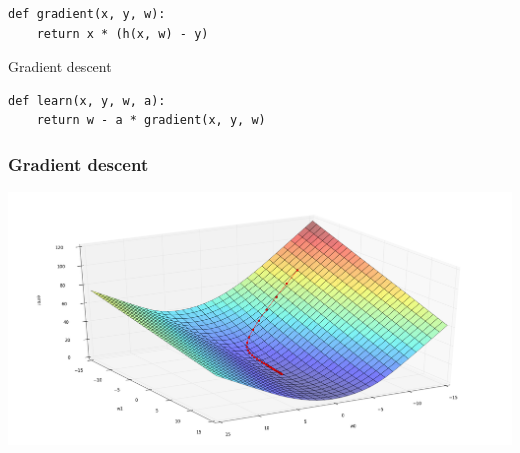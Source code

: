 \begin{frame}[fragile]
  \begin{block}{}
    \begin{lstlisting}
def gradient(x, y, w):
    return x * (h(x, w) - y)
    \end{lstlisting}
  \end{block}
\end{frame}

\begin{frame}[fragile]
  \begin{block}{Gradient descent}
    \begin{lstlisting}
def learn(x, y, w, a):
    return w - a * gradient(x, y, w)
    \end{lstlisting}
  \end{block}
\end{frame}

\begin{frame}
  \frametitle{Gradient descent}
  \begin{center}
    \includegraphics[scale=0.22]{./pictures/gradient_descent.png}
  \end{center}
\end{frame}

